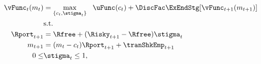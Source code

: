   \begin{equation*}\begin{gathered}\begin{aligned}
        \vFunc_{t}(m_{t})  & = \max_{\{{c}_{t},\stigma_{t}\}}   ~~ \uFunc(c_{t}) +  \DiscFac
        \ExEndStg[{\vFunc}_{t+1}(m_{t+1})]
        \\      & \text{s.t.} \nonumber
        \\      \Rport_{t+1}  & = \Rfree + (\Risky_{t+1}-\Rfree) \stigma_{t}
        \\      m_{t+1}  & = (m_{t}-c_{t})\Rport_{t+1} + \tranShkEmp_{t+1}
        \\  0       \leq & \stigma_{t}  \leq 1, \label{eq:noshorts}
      \end{aligned}\end{gathered}\end{equation*}

